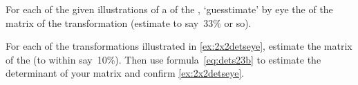 \begin{exercise} \label{ex:2x2detseye} 
For each of the given illustrations of a  of the , `guesstimate' by eye the  of the matrix of the transformation (estimate to say~33\% or so).
\begin{Parts}
\item {}

\item {}

\item {}

\item {}

\item {}

\item {}

\begin{reduce}
\item {}

\item {}

\item {}

\item {}

\item {}

\item {}
\end{reduce}
\end{Parts}
\end{exercise}




\begin{exercise}  
For each of the transformations illustrated in \autoref{ex:2x2detseye}, estimate the matrix of the  (to within say~10\%). 
Then use formula~\eqref{eq:dets23b} to estimate the determinant of your matrix and confirm \autoref{ex:2x2detseye}.
\end{exercise}





